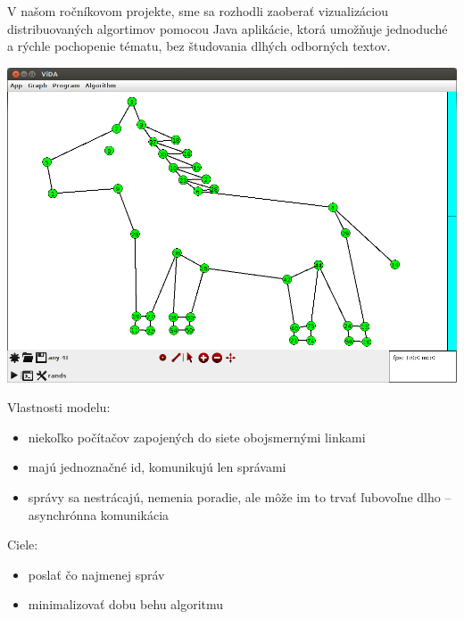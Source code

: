
V našom ročníkovom projekte, sme sa rozhodli zaoberať vizualizáciou distribuovaných algortimov
pomocou Java aplikácie, ktorá umožňuje jednoduché a rýchle pochopenie tématu, bez
študovania dlhých odborných textov.

\includegraphics[width=\columnwidth]{konik}


Vlastnosti modelu:
\begin{itemize}
    \item niekoľko počítačov zapojených do siete obojsmernými linkami
    \item majú jednoznačné id, komunikujú len správami
    \item správy sa nestrácajú, nemenia poradie, ale môže im to trvať ľubovoľne dlho -- asynchrónna
    komunikácia
\end{itemize}

Ciele:
\begin{itemize}
    \item poslať čo najmenej správ
    \item minimalizovať dobu behu algoritmu
\end{itemize}

